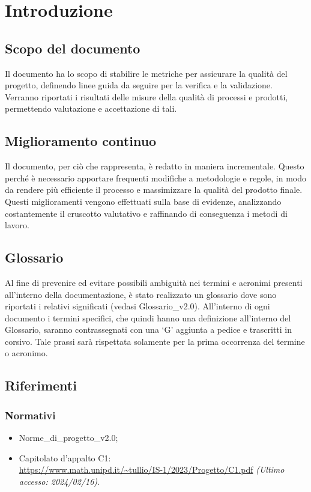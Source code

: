 \chapter{Introduzione}\label{chap:intro}

\section{Scopo del documento}
Il documento ha lo scopo di stabilire le metriche per assicurare la qualità del progetto, definendo linee guida da seguire per la verifica e la validazione. Verranno riportati i risultati delle misure della qualità di processi e prodotti, permettendo valutazione e accettazione di tali.

\section{Miglioramento continuo}
Il documento, per ciò che rappresenta, è redatto in maniera incrementale. Questo perché è necessario apportare frequenti modifiche a metodologie e regole, in modo da rendere più efficiente il processo e massimizzare la qualità del prodotto finale. Questi miglioramenti vengono effettuati sulla base di evidenze, analizzando costantemente il cruscotto valutativo e raffinando di conseguenza i metodi di lavoro.

\section{Glossario}
Al fine di prevenire ed evitare possibili ambiguità nei termini e acronimi presenti all’interno della documentazione, è stato realizzato un glossario dove sono riportati i relativi significati (vedasi Glossario\_v2.0). All’interno di ogni documento i termini specifici, che quindi hanno una definizione all’interno del Glossario, saranno contrassegnati con una ‘G’ aggiunta a pedice e trascritti in corsivo. Tale prassi sarà rispettata solamente per la prima occorrenza del termine o acronimo.

\section{Riferimenti}
\subsection{Normativi}
\begin{itemize}
    \item Norme\_di\_progetto\_v2.0;
    \item Capitolato d'appalto C1: \\ \url{https://www.math.unipd.it/~tullio/IS-1/2023/Progetto/C1.pdf} \textit{(Ultimo accesso: 2024/02/16)}.
\end{itemize}

